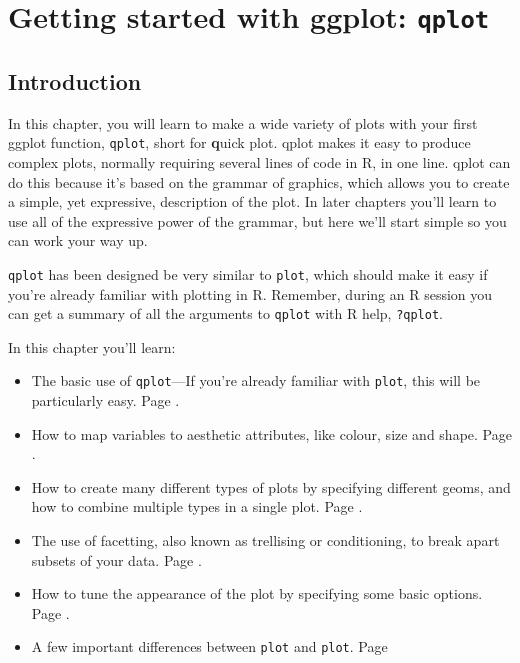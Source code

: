 


% 



\chapter{Getting started with ggplot: {\tt qplot}}

\section{Introduction} 

In this chapter, you will learn to make a wide variety of plots with your first ggplot function, {\tt qplot}, short for {\bf q}uick plot. qplot makes it easy to produce complex plots, normally requiring several lines of code in R, in one line. qplot can do this because it's based on the grammar of graphics, which allows you to create a simple, yet expressive, description of the plot.  In later chapters you'll learn to use all of the expressive power of the grammar, but here we'll start simple so you can work your way up.

{\tt qplot} has been designed be very similar to {\tt plot}, which should make it easy if you're already familiar with plotting in R.  Remember, during an R session you can get a summary of all the arguments to {\tt qplot} with R help, {\tt ?qplot}.

In this chapter you'll learn:

\begin{itemize}
	\item The basic use of {\tt qplot}---If you're already familiar with {\tt plot}, this will be particularly easy. Page \pageref{sec:basic_use}.
	\item How to map variables to aesthetic attributes, like colour, size and shape. Page \pageref{sec:aesthetic_attributes}.
	\item How to create many different types of plots by specifying different geoms, and how to combine multiple types in a single plot. Page \pageref{sec:plot_geoms}.
	\item The use of facetting, also known as trellising or conditioning, to break apart subsets of your data. Page \pageref{sec:facetting}.
	\item How to tune the appearance of the plot by specifying some basic options. Page \pageref{sec:other_options}.
	\item A few important differences between {\tt plot} and {\tt plot}.  Page \pageref{sec:plot_diffs}
\end{itemize}

